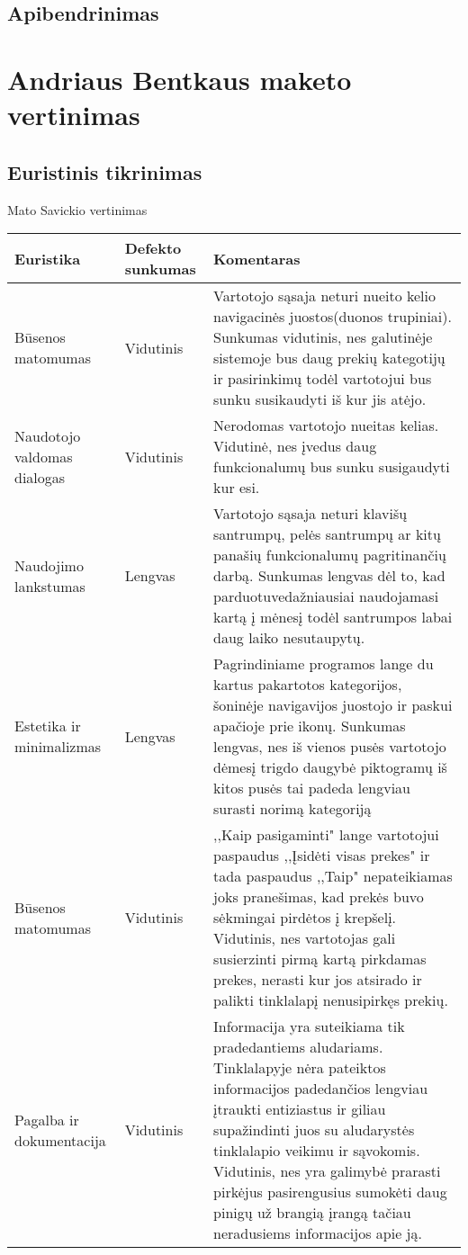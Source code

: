 \documentclass[oneside]{VUMIFPSkursinis}
\begin{document}
	\subsection{Apibendrinimas}
\iffalse XXXXXXXXXXXXXXXXXXXXXXXXXXXXXXXXXXXXXXXXXXXXXXXXXXXXXXXXXXXXXXXXXXXXXXXXXXXXXXXXXXXXXXXXXXXXXXXXXXXXXXXXXXXXXXXXXXXXXXXXXXXXXXXXXXXXXXX \fi

\section{Andriaus Bentkaus maketo vertinimas}
	\subsection{Euristinis tikrinimas}
Mato Savickio vertinimas
\begin{center}
    \begin{tabular}{ |p{3cm}| p{3cm} | p{11cm} | }
    \hline
   	 Euristika &Defekto sunkumas &Komentaras \\ \hline 
	Būsenos matomumas & Vidutinis & Vartotojo sąsaja neturi nueito kelio navigacinės juostos(duonos trupiniai). Sunkumas vidutinis, nes galutinėje sistemoje bus daug prekių kategotijų ir pasirinkimų todėl vartotojui bus sunku susikaudyti iš kur jis atėjo. \\ \hline
	Naudotojo valdomas dialogas & Vidutinis & Nerodomas vartotojo nueitas kelias. Vidutinė, nes įvedus daug funkcionalumų bus sunku susigaudyti kur esi. \\ \hline
	Naudojimo lankstumas & Lengvas & Vartotojo sąsaja neturi klavišų santrumpų, pelės santrumpų ar kitų panašių funkcionalumų pagritinančių darbą.
							Sunkumas lengvas dėl to, kad parduotuvedažniausiai naudojamasi kartą į mėnesį todėl santrumpos labai daug laiko nesutaupytų. \\ \hline
	Estetika ir minimalizmas & Lengvas & Pagrindiniame programos lange du kartus pakartotos kategorijos, šoninėje navigavijos juostojo ir paskui apačioje prie ikonų. Sunkumas lengvas, nes iš vienos pusės vartotojo dėmesį trigdo daugybė piktogramų iš kitos pusės tai padeda lengviau surasti norimą kategoriją \\ \hline
	Būsenos matomumas & Vidutinis & ,,Kaip pasigaminti" lange vartotojui paspaudus ,,Įsidėti visas prekes" ir tada paspaudus ,,Taip" nepateikiamas joks pranešimas, kad prekės buvo sėkmingai  pirdėtos į krepšelį. Vidutinis, nes vartotojas gali susierzinti pirmą kartą pirkdamas prekes, nerasti kur jos atsirado ir palikti tinklalapį nenusipirkęs prekių. \\ \hline
	Pagalba ir dokumentacija & Vidutinis & Informacija yra suteikiama tik pradedantiems aludariams.
							Tinklalapyje nėra pateiktos informacijos padedančios lengviau įtraukti entiziastus ir giliau supažindinti juos su aludarystės tinklalapio veikimu ir sąvokomis. Vidutinis, nes yra galimybė prarasti pirkėjus pasirengusius sumokėti daug pinigų už brangią įrangą tačiau neradusiems informacijos apie ją. \\ \hline

	
	
   \hline
    \end{tabular}
\end{center}
\pagebreak
\end{document}
